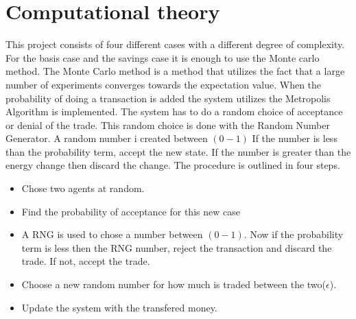 \section{Computational theory}\label{sec:comp-theory}

This project consists of four different cases with a different degree of complexity. For the basis case and the savings case it is enough to use the Monte carlo method. The Monte Carlo method is a method that utilizes the fact that a large number of experiments converges towards the expectation value. When the probability of doing a transaction is added the system utilizes the Metropolis Algorithm is implemented. The system has to do a random choice of acceptance or denial of the trade. This random choice is done with the Random Number Generator. A random number i created between $(0-1)$ If the number is less than the probability term, accept the new state. If the number is greater than the energy change then discard the change. The procedure is outlined in four steps.

\begin{itemize}
	\item Chose two agents at random.
	\item Find the probability of acceptance for this new case 
	\item A RNG is used to chose a number between $(0-1)$. Now if the probability term is less then the RNG number, reject the transaction and discard the trade. If not, accept the trade.
	\item Choose a new random number for how much is traded between the two($\epsilon$). 
	\item Update the system with the transfered money.
\end{itemize}



























